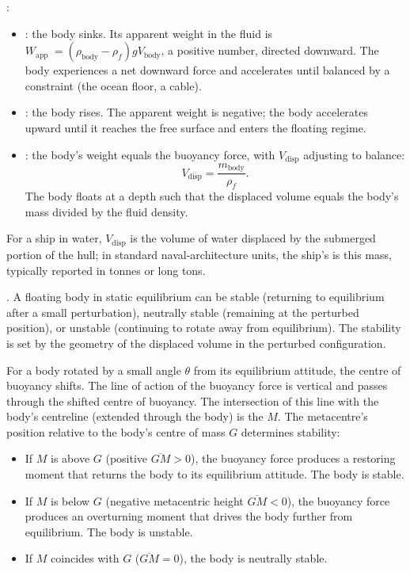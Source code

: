 

:

\begin{itemize}[leftmargin=*]
  \item {}: the
    body sinks. Its apparent weight in the fluid is $W_{\text{app
    }} = (\rho_{\text{body}} - \rho_f) g V_{\text{body}}$, a
    positive number, directed downward. The body experiences a
    net downward force and accelerates until balanced by a
    constraint (the ocean floor, a cable).
  \item {}: the
    body rises. The apparent weight is negative; the body
    accelerates upward until it reaches the free surface and
    enters the floating regime.
  \item {}: the body's weight equals the buoyancy
    force, with $V_{\text{disp}}$ adjusting to balance:
    \[
    V_{\text{disp}} = \frac{m_{\text{body}}}{\rho_f}.
    \]
    The body floats at a depth such that the displaced volume
    equals the body's mass divided by the fluid density.
\end{itemize}

For a ship in water, $V_{\text{disp}}$ is the volume of water
displaced by the submerged portion of the hull; in standard
naval-architecture units, the ship's  is
this mass, typically reported in tonnes or long tons.

. A floating body in
static equilibrium can be stable (returning to equilibrium after a
small perturbation), neutrally stable (remaining at the perturbed
position), or unstable (continuing to rotate away from
equilibrium). The stability is set by the geometry of the
displaced volume in the perturbed configuration.

For a body rotated by a small angle $\theta$ from its
equilibrium attitude, the centre of buoyancy shifts. The line of
action of the buoyancy force is vertical and passes through the
shifted centre of buoyancy. The intersection of this line with
the body's centreline (extended through the body) is the
 $M$. The metacentre's position relative to
the body's centre of mass $G$ determines stability:

\begin{itemize}[leftmargin=*]
  \item If $M$ is above $G$ (positive  $\overline{GM} > 0$), the buoyancy force produces a
    restoring moment that returns the body to its equilibrium
    attitude. The body is stable.
  \item If $M$ is below $G$ (negative metacentric height
    $\overline{GM} < 0$), the buoyancy force produces an
    overturning moment that drives the body further from
    equilibrium. The body is unstable.
  \item If $M$ coincides with $G$ ($\overline{GM} = 0$), the
    body is neutrally stable.
\end{itemize}

